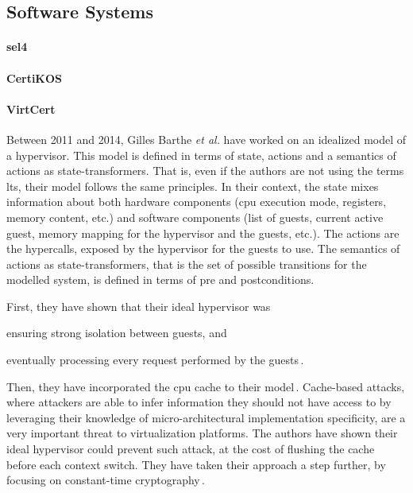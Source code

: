 \subsection{Software Systems}

\paragraph{sel4}

\paragraph{CertiKOS}

\paragraph{VirtCert}
%
Between 2011 and 2014, Gilles Barthe \emph{et al.} have worked on an idealized
model of a hypervisor.
%
This model is defined in terms of state, actions and a semantics of actions as
state-transformers.
%
That is, even if the authors are not using the terms \ac{lts}, their model
follows the same principles.
%
In their context, the state mixes information about both hardware components
(\ac{cpu} execution mode, registers, memory content, etc.) and software
components (list of guests, current active guest, memory mapping for the
hypervisor and the guests, etc.).
%
The actions are the hypercalls, exposed by the hypervisor for the guests to use.
%
The semantics of actions as state-transformers, that is the set of possible
transitions for the modelled system, is defined in terms of pre and
postconditions.

First, they have shown that their ideal hypervisor was
%
\begin{inparaenum}[(1)]
\item ensuring strong isolation between guests, and
%
\item eventually processing every request performed by the
  guests\,\cite{barthe2011virtcert1}.
\end{inparaenum}
%
Then, they have incorporated the \ac{cpu} cache to their
model\,\cite{barthe2012virtcert2}.
%
Cache-based attacks, where attackers are able to infer information they should
not have access to by leveraging their knowledge of micro-architectural
implementation specificity, are a very important threat to virtualization
platforms.
%
The authors have shown their ideal hypervisor could prevent such attack, at the
cost of flushing the cache before each context switch.
%
They have taken their approach a step further, by focusing on constant-time
cryptography\,\cite{barthe2014virtcert3}.

